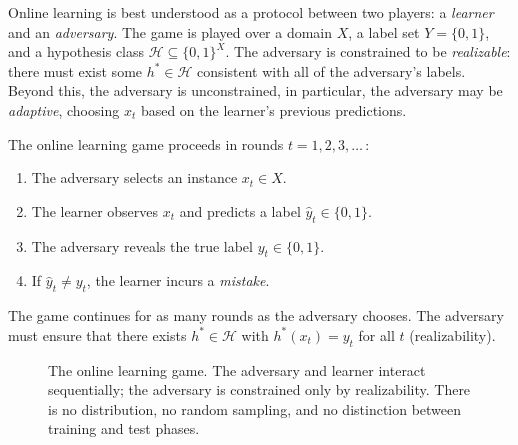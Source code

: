 Online learning is best understood as a protocol between two players: a \emph{learner} and an \emph{adversary}. The game is played over a domain $X$, a label set $Y = \{0,1\}$, and a hypothesis class $\mathcal{H} \subseteq \{0,1\}^X$. The adversary is constrained to be \emph{realizable}: there must exist some $h^* \in \mathcal{H}$ consistent with all of the adversary's labels. Beyond this, the adversary is unconstrained, in particular, the adversary may be \emph{adaptive}, choosing $x_t$ based on the learner's previous predictions.

\begin{defn}
\label{def:online-protocol}
  \leanok
The online learning game proceeds in rounds $t = 1, 2, 3, \ldots$\,:
\begin{enumerate}[leftmargin=*, itemsep=2pt]
\item The adversary selects an instance $x_t \in X$.
\item The learner observes $x_t$ and predicts a label $\hat{y}_t \in \{0,1\}$.
\item The adversary reveals the true label $y_t \in \{0,1\}$.
\item If $\hat{y}_t \neq y_t$, the learner incurs a \emph{mistake}.
\end{enumerate}
The game continues for as many rounds as the adversary chooses. The adversary must ensure that there exists $h^* \in \mathcal{H}$ with $h^*(x_t) = y_t$ for all $t$ (realizability).
\end{defn}

\begin{figure}[ht]
\centering
{}
\caption{The online learning game. The adversary and learner interact sequentially; the adversary is constrained only by realizability. There is no distribution, no random sampling, and no distinction between training and test phases.}
\label{fig:online-protocol}
\end{figure}

